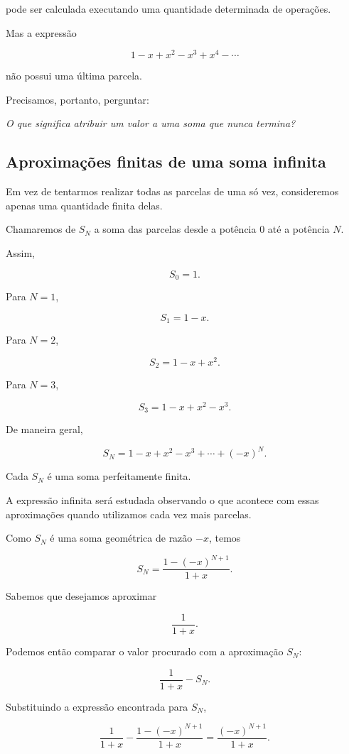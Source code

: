 \documentclass[12pt,a4paper]{article}
\begin{document}
pode ser calculada executando uma quantidade determinada de operações.

Mas a expressão

\[
1-x+x^2-x^3+x^4-\cdots
\]

não possui uma última parcela.

Precisamos, portanto, perguntar:

\begin{center}
\emph{O que significa atribuir um valor a uma soma que nunca termina?}
\end{center}

\subsection{Aproximações finitas de uma soma infinita}

Em vez de tentarmos realizar todas as parcelas de uma só vez,
consideremos apenas uma quantidade finita delas.

Chamaremos de \(S_N\) a soma das parcelas desde a potência \(0\) até a
potência \(N\).

Assim,

\[
S_0=1.
\]

Para \(N=1\),

\[
S_1=1-x.
\]

Para \(N=2\),

\[
S_2=1-x+x^2.
\]

Para \(N=3\),

\[
S_3=1-x+x^2-x^3.
\]

De maneira geral,

\[
S_N
=
1-x+x^2-x^3+\cdots+(-x)^N.
\]

Cada \(S_N\) é uma soma perfeitamente finita.

A expressão infinita será estudada observando o que acontece com essas
aproximações quando utilizamos cada vez mais parcelas.

Como \(S_N\) é uma soma geométrica de razão \(-x\), temos

\[
S_N
=
\frac{1-(-x)^{N+1}}{1+x}.
\]

Sabemos que desejamos aproximar

\[
\frac{1}{1+x}.
\]

Podemos então comparar o valor procurado com a aproximação \(S_N\):

\[
\frac{1}{1+x}-S_N.
\]

Substituindo a expressão encontrada para \(S_N\),

\[
\frac{1}{1+x}
-
\frac{1-(-x)^{N+1}}{1+x}
=
\frac{(-x)^{N+1}}{1+x}.
\]
\end{document}
